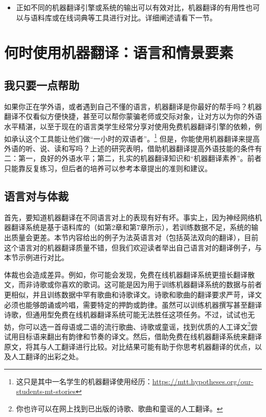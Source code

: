 \documentclass[output=paper,colorlinks,citecolor=brown]{langscibook}
\begin{document}
\begin{itemize}
\item 正如不同的机器翻译引擎或系统的输出可以有效对比，机器翻译的有用性也可以与语料库或在线词典等工具进行对比。详细阐述请看下一节。
\end{itemize}


\section{何时使用机器翻译：语言和情景要素}\label{sec:carre:4}
\subsection{我只要一点帮助} \label{sec:carre:4.1}

如果你正在学外语，或者遇到自己不懂的语言，机器翻译是你最好的帮手吗？机器翻译不仅看似方便快捷，甚至可以帮你蒙骗老师或交际对象，让对方以为你的外语水平精湛，以至于现在的语言类学生经常分享对使用免费机器翻译引擎的依赖，例如承认这个工具能让他们做“一小时的双语者”。\footnote{这只是其中一名学生的机器翻译使用经历：\url{https://mtt.hypotheses.org/our-students-mt-stories}}  但是，你能使用机器翻译来提高外语的听、说、读和写吗？上述的研究表明，借助机器翻译提高外语技能的条件有二：第一，良好的外语水平；第二，扎实的机器翻译知识和“机器翻译素养”\citep{BowkerCiro2019}。前者只能靠反复练习，但后者的培养可以参考本章提出的准则和建议。

\subsection{语言对与体裁} 
首先，要知道机器翻译在不同语言对上的表现有好有坏。事实上，因为神经网络机器翻译系统是基于语料库的（如第2章和第7章所示），若训练数据不足，系统的输出质量会更差。本节内容给出的例子为法英语言对（包括英法双向的翻译），目前这个语言对的机器翻译质量不错，但我们欢迎读者举出自己语言对的翻译例子，与本节示例进行对比。

体裁也会造成差异。例如，你可能会发现，免费在线机器翻译系统更擅长翻译散文，而非诗歌或你喜欢的歌词。这可能是因为用于训练机器翻译系统的数据与前者更相似，并且训练数据中罕有歌曲和诗歌译文。诗歌和歌曲的翻译要求严苛，译文必须也能够朗诵或吟唱，需要特定的押韵或韵律。虽然可以训练机器撰写甚至翻译诗歌\citep{VandeCruys2018, VandeCruys2019, VandeCruys2020}，但通用型免费在线机器翻译系统可能无法胜任这项任务。不过，试试也无妨，你可以选一首母语或二语的流行歌曲、诗歌或童谣，找到优质的人工译文\footnote{你也许可以在网上找到已出版的诗歌、歌曲和童谣的人工翻译。}尝试用目标语来翻出有韵律和节奏的译文。然后，借助免费在线机器翻译系统来翻译原文，将其与人工翻译进行比较。对比结果可能有助于你思考机器翻译的优点，以及人工翻译的出彩之处。
\end{document}
